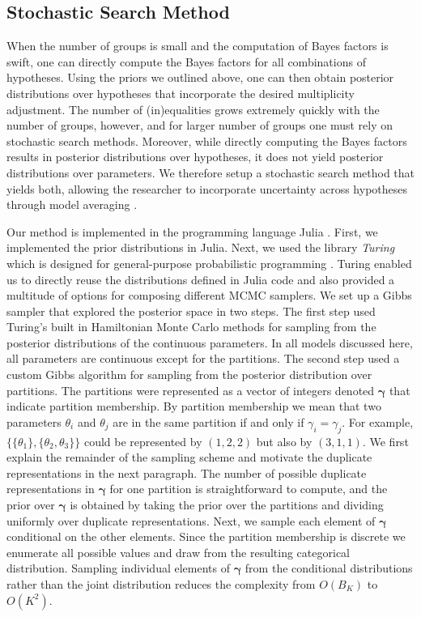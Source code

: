 \documentclass[11pt,a4paper]{article}
\theoremstyle{definition} %
\theoremstyle{case}
\begin{document}
\subsection{Stochastic Search Method}
When the number of groups is small and the computation of Bayes factors is swift, one can directly compute the Bayes factors for all combinations of hypotheses. Using the priors we outlined above, one can then obtain posterior distributions over hypotheses that incorporate the desired multiplicity adjustment. The number of (in)equalities grows extremely quickly with the number of groups, however, and for larger number of groups one must rely on stochastic search methods. Moreover, while directly computing the Bayes factors results in posterior distributions over hypotheses, it does not yield posterior distributions over parameters. We therefore setup a stochastic search method that yields both, allowing the researcher to incorporate uncertainty across hypotheses through model averaging \parencite[e.g.,][]{hinne2020conceptual, hoeting1999bayesian}.

Our method is implemented in the programming language Julia \parencite{Julia2017Bezanson}. First, we implemented the prior distributions in Julia. Next, we used the library \emph{Turing} which is designed for general-purpose probabilistic programming \parencite{Turing2018Ge}. Turing enabled us to directly reuse the distributions defined in Julia code and also provided a multitude of options for composing different MCMC samplers. We set up a Gibbs sampler that explored the posterior space in two steps. The first step used Turing's built in Hamiltonian Monte Carlo methods for sampling from the posterior distributions of the continuous parameters. In all models discussed here, all parameters are continuous except for the partitions. The second step used a custom Gibbs algorithm for sampling from the posterior distribution over partitions. The partitions were represented as a vector of integers denoted $\bm{\gamma}$ that indicate partition membership. By partition membership we mean that two parameters $\theta_i$ and $\theta_j$ are in the same partition if and only if $\gamma_i = \gamma_j$. For example, $\{\{\theta_1\}, \{\theta_2, \theta_3\}\}$ could be represented by $(1, 2, 2)$ but also by $(3, 1, 1)$. We first explain the remainder of the sampling scheme and motivate the duplicate representations in the next paragraph. The number of possible duplicate representations in $\bm{\gamma}$ for one partition is straightforward to compute, and the prior over $\bm{\gamma}$ is obtained by taking the prior over the partitions and dividing uniformly over duplicate representations. Next, we sample each element of $\bm{\gamma}$ conditional on the other elements. Since the partition membership is discrete we enumerate all possible values and draw from the resulting categorical distribution. Sampling individual elements of $\bm{\gamma}$ from the conditional distributions rather than the joint distribution reduces the complexity from $O(B_K)$ to $O(K^2)$.
\end{document}
